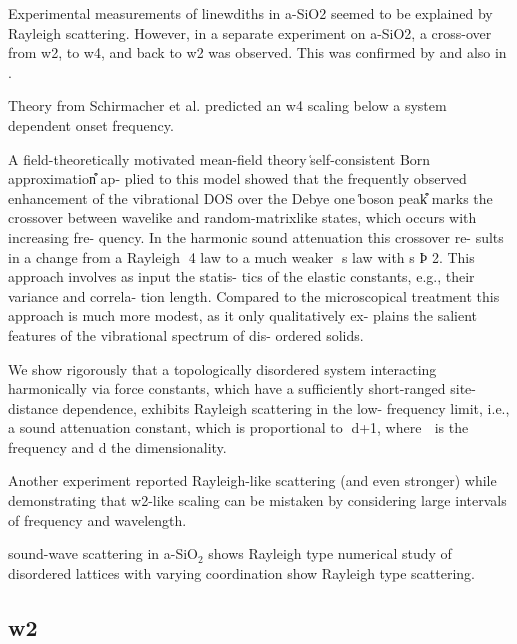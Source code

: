 \documentclass[aps,prb,twocolumn,superscriptaddress,footinbib,amsmath,amssymb,floatfix]{revtex4}
\begin{document}
Experimental measurements of linewdiths in a-SiO2 
seemed to be explained by Rayleigh scattering.
\cite{wischnewski_sound-wave_1998}
However, in a separate experiment on a-SiO2, 
a cross-over from w2, to w4, and back to w2 was observed.
\cite{masciovecchio_evidence_2006} This was confirmed 
by \cite{baldi_elastic_2011} and also in 
\cite{baldi_emergence_2013}.

Theory from Schirmacher et al. predicted 
an w4 scaling below a system dependent onset frequency.
\cite{schirmacher_thermal_2006,schirmacher_acoustic_2007}

A field-theoretically motivated
mean-field theory ͑self-consistent Born approximation͒ ap-
plied to this model
\cite{schirmacher_thermal_2006,schmid_raman_2008,
schirmacher_vibrational_2008}
showed that the frequently observed
enhancement of the vibrational DOS over the Debye one
͑boson peak͒ marks the crossover between wavelike and
random-matrixlike states, which occurs with increasing fre-
quency. In the harmonic sound attenuation this crossover re-
sults in a change from a Rayleigh ␻4 law to a much weaker
␻s law with s Ϸ 2. This approach involves as input the statis-
tics of the elastic constants, e.g., their variance and correla-
tion length. Compared to the microscopical treatment this
approach is much more modest, as it only qualitatively ex-
plains the salient features of the vibrational spectrum of dis-
ordered solids.

We show rigorously that a topologically disordered system interacting 
harmonically via force constants,
which have a sufficiently short-ranged site-distance dependence, 
exhibits Rayleigh scattering in the low-
frequency limit, i.e., a sound attenuation constant, which is 
proportional to ␻d+1, where ␻ is the frequency and
d the dimensionality.\cite{ganter_rayleigh_2010} 

Another experiment reported Rayleigh-like scattering (and even 
stronger) while demonstrating that w2-like scaling 
can be mistaken by considering large intervals of 
frequency and wavelength.\cite{ruffle_observation_2003}

sound-wave scattering in a-SiO$_2$ shows Rayleigh type 
\cite{wischnewski_sound-wave_1998}
numerical study of disordered lattices with varying coordination 
show Rayleigh type scattering.\cite{wyart_scaling_2010} 

\subsection{\label{S:Theory:Thermal}w2}
\end{document}
